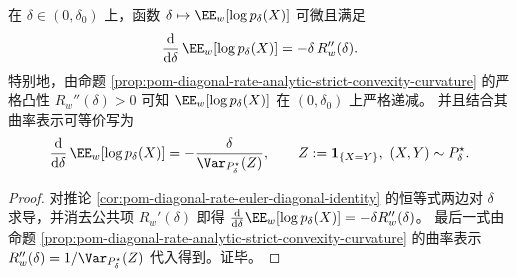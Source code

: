 \begin{proposition}\label{prop:pom-diagonal-rate-diagonal-log-feedback}
在 \(\delta\in(0,\delta_0)\) 上，函数 \(\delta\mapsto \EE_w[\log p_\delta(X)]\) 可微且满足
\[
\frac{\mathrm d}{\mathrm d\delta}\,\EE_w[\log p_\delta(X)]
=-\delta\,R_w''(\delta).
\]
特别地，由命题 \ref{prop:pom-diagonal-rate-analytic-strict-convexity-curvature} 的严格凸性 \(R_w''(\delta)>0\) 可知
\(\EE_w[\log p_\delta(X)]\) 在 \((0,\delta_0)\) 上严格递减。
并且结合其曲率表示可等价写为
\[
\frac{\mathrm d}{\mathrm d\delta}\,\EE_w[\log p_\delta(X)]
=-\frac{\delta}{\Var_{P^\star_\delta}(Z)},
\qquad
Z:=\mathbf 1_{\{X=Y\}},\ (X,Y)\sim P^\star_\delta.
\]
\end{proposition}
\begin{proof}
对推论 \ref{cor:pom-diagonal-rate-euler-diagonal-identity} 的恒等式两边对 \(\delta\) 求导，并消去公共项 \(R_w'(\delta)\) 即得
\(
\frac{\mathrm d}{\mathrm d\delta}\EE_w[\log p_\delta(X)]=-\delta R_w''(\delta)
\)。
最后一式由命题 \ref{prop:pom-diagonal-rate-analytic-strict-convexity-curvature} 的曲率表示 \(R_w''(\delta)=1/\Var_{P^\star_\delta}(Z)\) 代入得到。证毕。
\end{proof}

